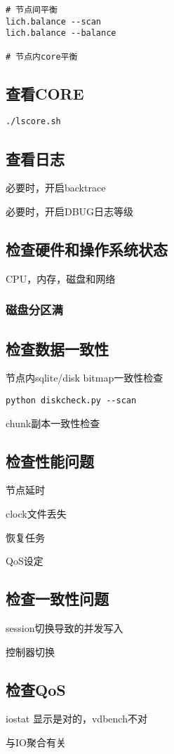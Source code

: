 \begin{lstlisting}
# 节点间平衡
lich.balance --scan
lich.balance --balance

# 节点内core平衡
\end{lstlisting}

\subsection{查看CORE}

\begin{lstlisting}
./lscore.sh
\end{lstlisting}

\subsection{查看日志}

必要时，开启backtrace

必要时，开启DBUG日志等级

\subsection{检查硬件和操作系统状态}

CPU，内存，磁盘和网络

\subsubsection{磁盘分区满}




\subsection{检查数据一致性}

节点内sqlite/disk bitmap一致性检查

\begin{lstlisting}
python diskcheck.py --scan
\end{lstlisting}

chunk副本一致性检查

\subsection{检查性能问题}

节点延时

clock文件丢失

恢复任务

QoS设定

\subsection{检查一致性问题}

session切换导致的并发写入

控制器切换

\subsection{检查QoS}

iostat 显示是对的，vdbench不对

与IO聚合有关
